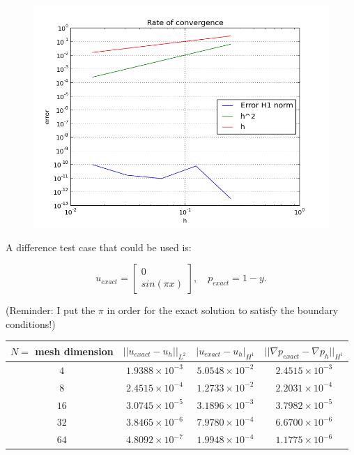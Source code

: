 \documentclass[11pt,a4paper,titlepage]{report}
\begin{document}
\vspace{1cm}
\begin{figure}[ht]
\centering
\includegraphics[width=\textwidth]{convergence_poly}
\end{figure}
\vspace{1cm}

\newpage
A difference test case that could be used is:

\[
u_{exact} = \left[ \begin{array}{c} 0 \\ sin(\pi x) \end{array} \right], \quad 
p_{exact} = 1-y.
\]

(Reminder: I put the $\pi$ in order for the exact solution to satisfy the boundary conditions!)

\begin{center}
\begin{tabular}{| c | c | c | c |}
\hline
$N = $ mesh dimension & $|| u_{exact} - u_h ||_{L^2}$ & $ | u_{exact} - u_h |_{H^1}$ & $|| \nabla p_{exact} - \nabla p_h ||_{H^1} $ \\
\hline
$ 4 $ & $1.9388 \times 10^{-3}$ & $5.0548 \times 10^{-2}$ & $2.4515 \times 10^{-3}$ \\
\hline
$ 8$ & $2.4515  \times 10^{-4}$ & $1.2733 \times 10^{-2}$ & $2.2031 \times 10^{-4}$ \\
\hline
$ 16 $ & $ 3.0745 \times 10^{-5}$ & $3.1896 \times 10^{-3}$ & $3.7982 \times 10^{-5}$\\
\hline
$ 32$ & $3.8465 \times 10^{-6}$ & $7.9780 \times 10^{-4}$ & $6.6700 \times 10^{-6}$ \\
\hline
$ 64$ & $4.8092 \times 10^{-7}$ & $1.9948 \times 10^{-4}$ & $1.1775 \times 10^{-6}$\\
\hline
\end{tabular}
\end{center}
\end{document}
